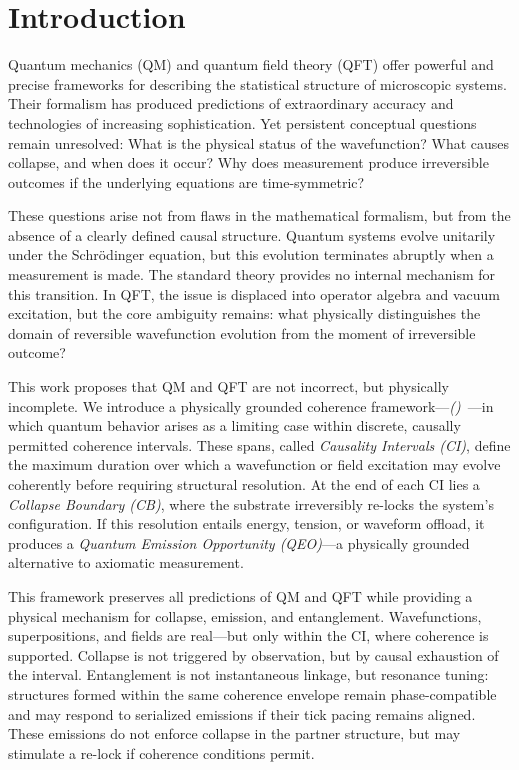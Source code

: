 \documentclass[preprints,article,submit,pdftex,moreauthors]{Definitions/mdpi}
\begin{document}

\section{Introduction}

Quantum mechanics (QM) and quantum field theory (QFT) offer powerful and precise frameworks for describing the statistical structure of microscopic systems. Their formalism has produced predictions of extraordinary accuracy and technologies of increasing sophistication. Yet persistent conceptual questions remain unresolved: What is the physical status of the wavefunction? What causes collapse, and when does it occur? Why does measurement produce irreversible outcomes if the underlying equations are time-symmetric?

These questions arise not from flaws in the mathematical formalism, but from the absence of a clearly defined causal structure. Quantum systems evolve unitarily under the Schrödinger equation, but this evolution terminates abruptly when a measurement is made. The standard theory provides no internal mechanism for this transition. In QFT, the issue is displaced into operator algebra and vacuum excitation, but the core ambiguity remains: what physically distinguishes the domain of reversible wavefunction evolution from the moment of irreversible outcome?

This work proposes that QM and QFT are not incorrect, but physically incomplete. We introduce a physically grounded coherence framework—\textit{\qsdgst (\qsdgsta)}~\cite{bush-gst}—in which quantum behavior arises as a limiting case within discrete, causally permitted coherence intervals. These spans, called \textit{Causality Intervals (CI)}, define the maximum duration over which a wavefunction or field excitation may evolve coherently before requiring structural resolution. At the end of each CI lies a \textit{Collapse Boundary (CB)}, where the substrate irreversibly re-locks the system's configuration. If this resolution entails energy, tension, or waveform offload, it produces a \textit{Quantum Emission Opportunity (QEO)}—a physically grounded alternative to axiomatic measurement.

This framework preserves all predictions of QM and QFT while providing a physical mechanism for collapse, emission, and entanglement. Wavefunctions, superpositions, and fields are real—but only within the CI, where coherence is supported. Collapse is not triggered by observation, but by causal exhaustion of the interval. Entanglement is not instantaneous linkage, but resonance tuning: structures formed within the same coherence envelope remain phase-compatible and may respond to serialized emissions if their tick pacing remains aligned. These emissions do not enforce collapse in the partner structure, but may stimulate a re-lock if coherence conditions permit.
\end{document}
